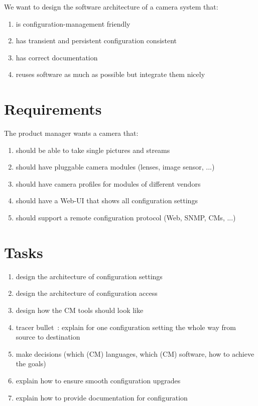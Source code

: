 We want to design the software architecture of a camera system that:

\begin{enumerate}
	\item is configuration-management friendly
	\item has transient and persistent configuration consistent
	\item has correct documentation
	\item reuses software as much as possible but integrate them nicely
\end{enumerate}

\section{Requirements}

The product manager wants a camera that:

\begin{enumerate}
	\item should be able to take single pictures and streams
	\item should have pluggable camera modules (lenses, image sensor, ...)
	\item should have camera profiles for modules of different vendors
	\item should have a Web-UI that shows all configuration settings
	\item should support a remote configuration protocol (Web, SNMP, CMs, ...)
\end{enumerate}

\section{Tasks}

\begin{enumerate}
	\item design the architecture of configuration settings
	\item design the architecture of configuration access
	\item design how the CM tools should look like
	\item tracer bullet~\cite{hunt1999pragmatic}: explain for one configuration setting the whole way from source to destination
	\item make decisions (which (CM) languages, which (CM) software, how to achieve the goals)
	\item explain how to ensure smooth configuration upgrades
	\item explain how to provide documentation for configuration
\end{enumerate}



\begingroup
\sloppy
\makeatletter
\g@addto@macro{\UrlBreaks}{\UrlOrds}
\makeatother

\endgroup







